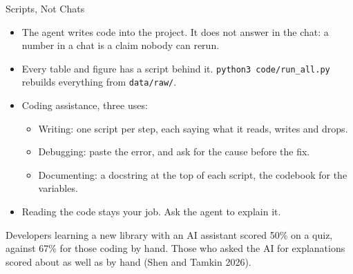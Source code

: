 \documentclass[svgnames,x11names,dvipsnames]{beamer}
\begin{document}
\begin{frame}{Scripts, Not Chats}

\begin{itemize}
    \setlength{\itemsep}{6pt}
    \item The agent writes code into the project. It does not answer in the chat: a number in a chat is a claim nobody can rerun.
    \item Every table and figure has a script behind it. \texttt{python3 code/run\_all.py} rebuilds everything from \texttt{data/raw/}.
    \item Coding assistance, three uses:
    \begin{itemize}
        \item Writing: one script per step, each saying what it reads, writes and drops.
        \item Debugging: paste the error, and ask for the cause before the fix.
        \item Documenting: a docstring at the top of each script, the codebook for the variables.
    \end{itemize}
    \item Reading the code stays your job. Ask the agent to explain it.
\end{itemize}

\vspace{0.3cm}

{\footnotesize Developers learning a new library with an AI assistant scored 50\% on a quiz, against 67\% for those coding by hand. Those who asked the AI for explanations scored about as well as by hand (Shen and Tamkin 2026).}

\end{frame}
\end{document}

